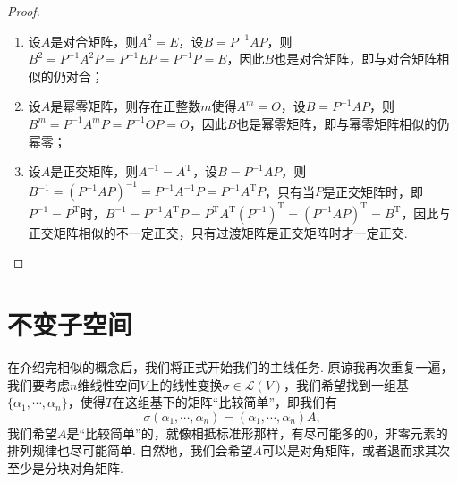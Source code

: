 \begin{enumerate}
\begin{proof}
\begin{enumerate}
                  \item 设$A$是对合矩阵，则$A^2=E$，设$B=P^{-1}AP$，则$B^2=P^{-1}A^2P=P^{-1}EP=P^{-1}P=E$，因此$B$也是对合矩阵，即与对合矩阵相似的仍对合；

                  \item 设$A$是幂零矩阵，则存在正整数$m$使得$A^m=O$，设$B=P^{-1}AP$，则$B^m=P^{-1}A^mP=P^{-1}OP=O$，因此$B$也是幂零矩阵，即与幂零矩阵相似的仍幂零；

                  \item 设$A$是正交矩阵，则$A^{-1}=A^\mathrm{T}$，设$B=P^{-1}AP$，则$B^{-1}=(P^{-1}AP)^{-1}=P^{-1}A^{-1}P=P^{-1}A^\mathrm{T}P$，只有当$P$是正交矩阵时，即$P^{-1}=P^\mathrm{T}$时，$B^{-1}=P^{-1}A^\mathrm{T}P=P^\mathrm{T}A^\mathrm{T}(P^{-1})^\mathrm{T}=(P^{-1}AP)^\mathrm{T}=B^\mathrm{T}$，因此与正交矩阵相似的不一定正交，只有过渡矩阵是正交矩阵时才一定正交.
              \end{enumerate}
          \end{proof}
\end{enumerate}

\section{不变子空间}

在介绍完相似的概念后，我们将正式开始我们的主线任务. 原谅我再次重复一遍，我们要考虑$n$维线性空间$V$上的线性变换$\sigma\in\mathcal{L}(V)$，我们希望找到一组基$\{\alpha_1,\cdots,\alpha_n\}$，使得$T$在这组基下的矩阵``比较简单''，即我们有
\[\sigma(\alpha_1,\cdots,\alpha_n)=(\alpha_1,\cdots,\alpha_n)A,\]
我们希望$A$是``比较简单''的，就像相抵标准形那样，有尽可能多的$0$，非零元素的排列规律也尽可能简单. 自然地，我们会希望$A$可以是对角矩阵，或者退而求其次至少是分块对角矩阵.

